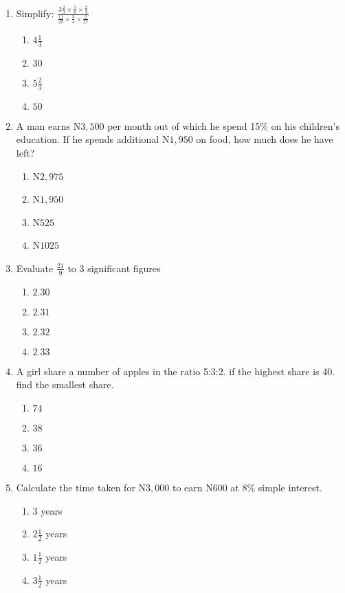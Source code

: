\begin{multicols}{2}
\begin{enumerate}[label={\arabic*.}]
\begin{enumerate}[label={\Alph*.}]
    \end{enumerate}
\item Simplify: \(\frac{3\frac{2}{3}\times\frac{5}{6}\times\frac{2}{3}}{\frac{11}{25}\times\frac{3}{4}\times\frac{2}{27}}\)
    \begin{enumerate}[label={\Alph*.}]
    \item \(4\frac{1}{3}\)
    \item \(30\)
    \item \(5\frac{2}{3}\)
    \item \(50\)

    \end{enumerate}
\item A man earns N\(3,500\) per month out of which he spend 15\% on his children's education. If he spends additional N\(1,950\) on food, how much does he have left? 
    \begin{enumerate}[label={\Alph*.}]
    \item N\(2,975\)
    \item N\(1,950\)
    \item N\(525\)
    \item N\(1025\)
    

    \end{enumerate}
\item Evaluate \(\frac{21}{9}\) to 3 significant figures
    \begin{enumerate}[label={\Alph*.}]
    \item \(2.30\)
    \item \(2.31\)
    \item \(2.32\)
    \item \(2.33\)

    \end{enumerate}
\item A girl share a number of apples in the ratio 5:3:2. if the highest share is 40. find the smallest share.
    \begin{enumerate}[label={\Alph*.}]
    \item \(74\)
    \item \(38\)
    \item \(36\)
    \item \(16\)

    \end{enumerate}
\item Calculate the time taken for N\(3,000\) to earn N600 at 8\% simple interest.
    \begin{enumerate}[label={\Alph*.}]
    \item \(3\) years
    \item \(2\frac{1}{2}\) years
    \item \(1\frac{1}{2}\) years
    \item \(3\frac{1}{2}\) years
    


\end{enumerate}
\end{enumerate}
\end{multicols}
